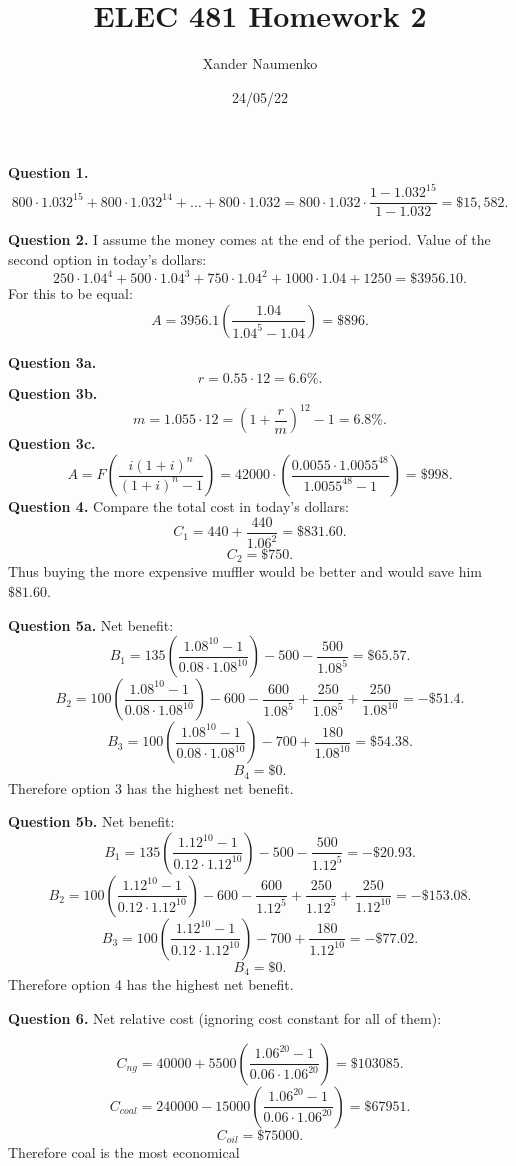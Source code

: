 \documentclass[letterpaper, reqno,11pt]{article}
\begin{document}
\title{ELEC 481 Homework 2}
\date{24/05/22}
\author{Xander Naumenko}
\maketitle

{\noindent\bf Question 1.}  
\[
800\cdot 1.032^{15}+800\cdot 1.032^{14}+\ldots+800\cdot 1.032=800\cdot 1.032\cdot \frac{1-1.032^{15}}{1-1.032}=\$15,582
.\]

{\noindent\bf Question 2.} I assume the money comes at the end of the period. Value of the second option in today's dollars: 
\[
250\cdot 1.04^{4}+500\cdot 1.04^{3}+750\cdot 1.04^{2}+1000\cdot 1.04+1250=\$3956.10
.\]
For this to be equal: 
\[
A=3956.1\left( \frac{1.04}{1.04^{5}-1.04} \right) =\$896
.\]

{\noindent\bf Question 3a.} 
\[
r=0.55\cdot 12=6.6\%
.\]
{\noindent\bf Question 3b.} 
\[
m=1.055\cdot 12=\left( 1+\frac{r}{m} \right)^{12}-1=6.8\%
.\]
{\noindent\bf Question 3c.} 
\[
A=F\left( \frac{i(1+i)^n}{(1+i)^{n}-1} \right) =42000\cdot \left( \frac{0.0055\cdot 1.0055^{48}}{1.0055^{48}-1} \right)=\$998
.\]
{\noindent\bf Question 4.} Compare the total cost in today's dollars: 
\[
C_{1}=440+\frac{440}{1.06^{2}}=\$831.60
.\]
\[
C_{2}=\$750
.\]
Thus buying the more expensive muffler would be better and would save him $\$81.60$. 

{\noindent\bf Question 5a.} Net benefit: 
\[
B_1=135\left( \frac{1.08^{10}-1}{0.08\cdot 1.08^{10}} \right) -500-\frac{500}{1.08^{5}}=\$65.57
.\]
\[
B_2=100\left( \frac{1.08^{10}-1}{0.08\cdot 1.08^{10}} \right) -600-\frac{600}{1.08^{5}}+\frac{250}{1.08^{5}}+\frac{250}{1.08^{10}}=-\$51.4
.\]
\[
B_3=100\left( \frac{1.08^{10}-1}{0.08\cdot 1.08^{10}} \right) -700+\frac{180}{1.08^{10}}=\$54.38
.\]
\[
B_4=\$0
.\]
Therefore option 3 has the highest net benefit. 

{\noindent\bf Question 5b.} Net benefit:
\[
B_1=135\left( \frac{1.12^{10}-1}{0.12\cdot 1.12^{10}} \right) -500-\frac{500}{1.12^{5}}=-\$20.93
.\]
\[
B_2=100\left( \frac{1.12^{10}-1}{0.12\cdot 1.12^{10}} \right) -600-\frac{600}{1.12^{5}}+\frac{250}{1.12^{5}}+\frac{250}{1.12^{10}}=-\$153.08
.\]
\[
B_3=100\left( \frac{1.12^{10}-1}{0.12\cdot 1.12^{10}} \right) -700+\frac{180}{1.12^{10}}=-\$77.02
.\]
\[
B_4=\$0
.\]
Therefore option 4 has the highest net benefit. 

{\noindent\bf Question 6.} Net relative cost (ignoring cost constant for all of them): 

\[
C_{ng}=40000+5500\left( \frac{1.06^{20}-1}{0.06\cdot 1.06^{20}} \right) =\$103085
.\]
\[
C_{coal}=240000-15000\left( \frac{1.06^{20}-1}{0.06\cdot 1.06^{20}} \right) =\$67951
.\]
\[
C_{oil}=\$75000
.\]
Therefore coal is the most economical
\end{document}
